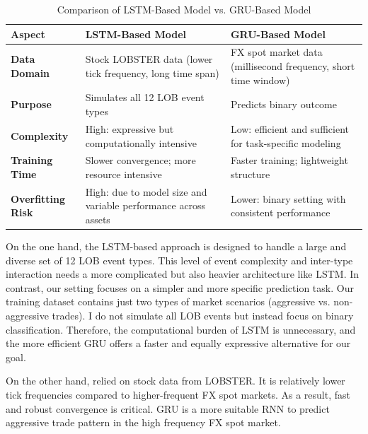 \begin{table}[H]
\centering
\caption{Comparison of LSTM-Based Model vs. GRU-Based Model}
\begin{tabular}{p{3cm} p{5.5cm} p{5.5cm}}
\toprule
\textbf{Aspect} & \textbf{LSTM-Based Model} & \textbf{GRU-Based Model} \\
\midrule
\textbf{Data Domain} & Stock LOBSTER data (lower tick frequency, long time span) & FX spot market data (millisecond frequency, short time window) \\
\textbf{Purpose} & Simulates all 12 LOB event types & Predicts binary outcome \\
\textbf{Complexity} & High: expressive but computationally intensive & Low: efficient and sufficient for task-specific modeling \\
\textbf{Training Time} & Slower convergence; more resource intensive & Faster training; lightweight structure \\
\textbf{Overfitting Risk} & High: due to model size and variable performance across assets & Lower: binary setting with consistent performance \\
\bottomrule
\end{tabular}
\label{tab:gru_vs_lstm}
\end{table}

On the one hand, the LSTM-based approach is designed to handle a large and diverse set of 12 LOB event types. This level of event complexity and inter-type interaction needs a more complicated but also heavier architecture like LSTM. In contrast, our setting focuses on a simpler and more specific prediction task. Our training dataset contains just two types of market scenarios (aggressive vs. non-aggressive trades). I do not simulate all LOB events but instead focus on binary classification. Therefore, the computational burden of LSTM is unnecessary, and the more efficient GRU offers a faster and equally expressive alternative for our goal.

On the other hand, \cite{lalor_event-based_2025} relied on stock data from LOBSTER. It is relatively lower tick frequencies compared to higher-frequent FX spot markets. As a result, fast and robust convergence is critical. GRU is a more suitable RNN to predict aggressive trade pattern in the high frequency FX spot market.


